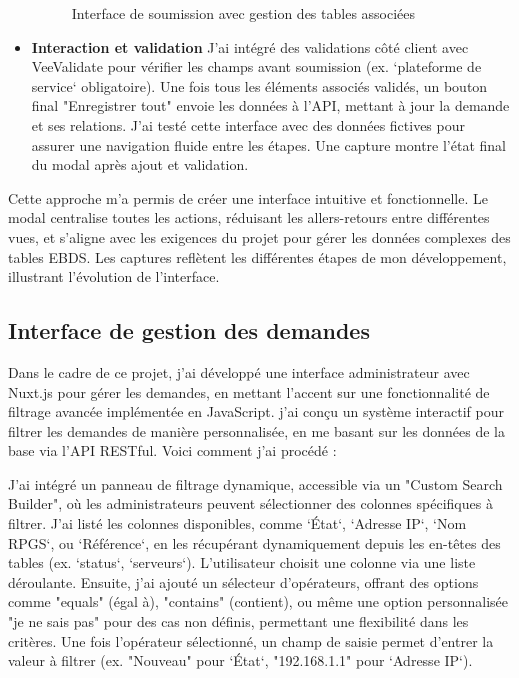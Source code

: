 \begin{itemize}
      \begin{figure}[h]
          \centering
          \caption{Interface de soumission avec gestion des tables associées}
          \label{fig:submission_ui_associated}
      \end{figure}
      
    \item \textbf{Interaction et validation}  
      J’ai intégré des validations côté client avec VeeValidate pour vérifier les champs avant soumission (ex. `plateforme de service` obligatoire). Une fois tous les éléments associés validés, un bouton final "Enregistrer tout" envoie les données à l’API, mettant à jour la demande et ses relations. J’ai testé cette interface avec des données fictives pour assurer une navigation fluide entre les étapes. Une capture montre l’état final du modal après ajout et validation.
\end{itemize}

Cette approche m’a permis de créer une interface intuitive et fonctionnelle. Le modal centralise toutes les actions, réduisant les allers-retours entre différentes vues, et s’aligne avec les exigences du projet pour gérer les données complexes des tables EBDS. Les captures reflètent les différentes étapes de mon développement, illustrant l’évolution de l’interface.

\subsection{Interface de gestion des demandes}

Dans le cadre de ce projet, j’ai développé une interface administrateur avec Nuxt.js pour gérer les demandes, en mettant l’accent sur une fonctionnalité de filtrage avancée implémentée en JavaScript. j’ai conçu un système interactif pour filtrer les demandes de manière personnalisée, en me basant sur les données de la base via l’API RESTful. Voici comment j’ai procédé :

J’ai intégré un panneau de filtrage dynamique, accessible via un "Custom Search Builder", où les administrateurs peuvent sélectionner des colonnes spécifiques à filtrer. J’ai listé les colonnes disponibles, comme `État`, `Adresse IP`, `Nom RPGS`, ou `Référence`, en les récupérant dynamiquement depuis les en-têtes des tables (ex. `status`, `serveurs`). L’utilisateur choisit une colonne via une liste déroulante. Ensuite, j’ai ajouté un sélecteur d’opérateurs, offrant des options comme "equals" (égal à), "contains" (contient), ou même une option personnalisée "je ne sais pas" pour des cas non définis, permettant une flexibilité dans les critères. Une fois l’opérateur sélectionné, un champ de saisie permet d’entrer la valeur à filtrer (ex. "Nouveau" pour `État`, "192.168.1.1" pour `Adresse IP`).

